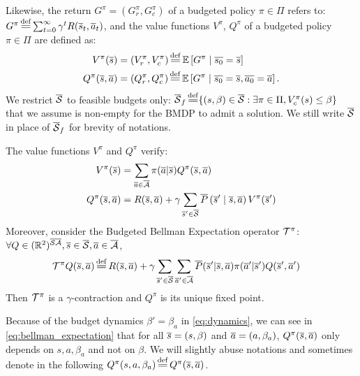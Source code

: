 Likewise, the return $G^\pi = (G_r^\pi, G_c^\pi)$ of a budgeted policy $\pi\in\Pi$ refers to:
$G^\pi \eqdef \sum_{t=0}^\infty \gamma^t R(\os_t, \oa_t)$,
and the value functions $V^\pi$, $Q^\pi$ of a budgeted policy $\pi\in\Pi$ are defined as:
\begin{align}
\label{eq:value-function}
V^\pi(\os) &= (V_r^\pi, V_c^\pi) \eqdef \expectedvalue\left[ G^\pi \condbar \ov{s_0} = \os\right]\\ Q^\pi(\os, \oa)&= (Q_r^\pi, Q_c^\pi) \eqdef \expectedvalue\left[ G^\pi \condbar \ov{s_0} = \os, \ov{a_0} = \oa\right].
\end{align}
We restrict $\overline{\mathcal{S}}$ to feasible budgets only: $\ocS_f \eqdef \{(s,\beta)\in\ocS: \exists \pi\in\Pi, V_c^\pi(s) \leq \beta\}$ that we assume is non-empty for the BMDP to admit a solution. We still write $\overline{\mathcal{S}}$ in place of $\overline{\mathcal{S}}_f$ for brevity of notations.

\begin{proposition}
	\begin{leftbar}[propositionbar]
	\label{prop:bellman-expectation}
	The value functions $V^\pi$ and $ Q^\pi$ verify:
	\begin{align}
	V^\pi(\overline{s}) &= \sum_{\overline{a}\in\overline{\mathcal{A}}}\pi(\overline{a} | \overline{s}) Q^\pi(\overline{s}, \overline{a}) \\ Q^\pi(\overline{s}, \overline{a}) &= R(\overline{s}, \overline{a}) + \gamma\sum_{\overline{s}'\in\overline{\mathcal{S}}}\overline{P}\left(\overline{s}' \;\middle|\; \overline{s}, \overline{a}\right) V^\pi(\overline{s}') \label{eq:bellman_expectation}
	\end{align}
	Moreover, consider the Budgeted Bellman Expectation operator $\mathcal{T}^\pi$:
	$\forall Q\in(\mathbb{R}^2)^{\overline{\mathcal{S}}\overline{\mathcal{A}}}, \overline{s}\in\overline{\mathcal{S}}, \overline{a}\in\overline{\mathcal{A}}$,
	\begin{align}
	\label{eq:bellman_expectation_operator}
	\cT^\pi Q(\os, \oa) &\eqdef R(\os, \oa) + \gamma \sum_{\os'\in\ocS}\sum_{\oa'\in\ocA}\ov{P}(\os'|\os, \oa)\pi(\oa'|\os') Q(\os', \oa')
	\end{align}
	Then $\mathcal{T}^\pi$ is a $\gamma$-contraction and $Q^\pi$ is its unique fixed point.
	\end{leftbar}
\end{proposition}

\begin{remark}
	\begin{leftbar}[remarkbar]
	Because of the budget dynamics $\beta' = \beta_a$ in \eqref{eq:dynamics}, we can see in \eqref{eq:bellman_expectation} that for all $\overline{s}=(s, \beta)$ and $\overline{a}=(a, \beta_a)$, $Q^\pi(\overline{s}, \overline{a})$ only depends on $s, a, \beta_a$ and not on $\beta$. We will slightly abuse notations and sometimes denote in the following $Q^\pi(s, a, \beta_a) \eqdef Q^\pi(\os, \oa)$.
	\end{leftbar}
\end{remark}

